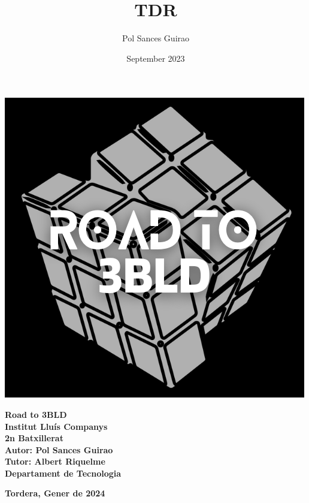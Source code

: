 \documentclass[11pt,oneside]{book}
\title{TDR}
\author{Pol Sances Guirao}
\date{September 2023}
\begin{document}
\frontmatter


\begin{titlepage}
    \centering
    \vspace*{\fill}
    
    \begin{minipage}{0.4\textwidth}
        \includegraphics[width=\textwidth]{img/logos/logo_TdR.png}
    \end{minipage}
    \hfill
    \begin{minipage}{0.5\textwidth}
        \begin{center}
            \textbf{\Huge Road to 3BLD}\\
            \vspace{0.5cm}
            \textbf{\LARGE Institut Lluís Companys}\\
            \vspace{0.5cm}
            \textbf{\Large 2n Batxillerat}\\
            \vspace{0.5cm}
            \textbf{\large Autor: Pol Sances Guirao}\\
            \vspace{0.5cm}
            \textbf{\large Tutor: Albert Riquelme}\\
            \vspace{0.5cm}
            \textbf{\large Departament de Tecnologia}
        \end{center}
    \end{minipage}

    \vfill
    \vspace*{\fill}
    \textbf{Tordera, Gener de 2024}
\end{titlepage}
\end{document}

